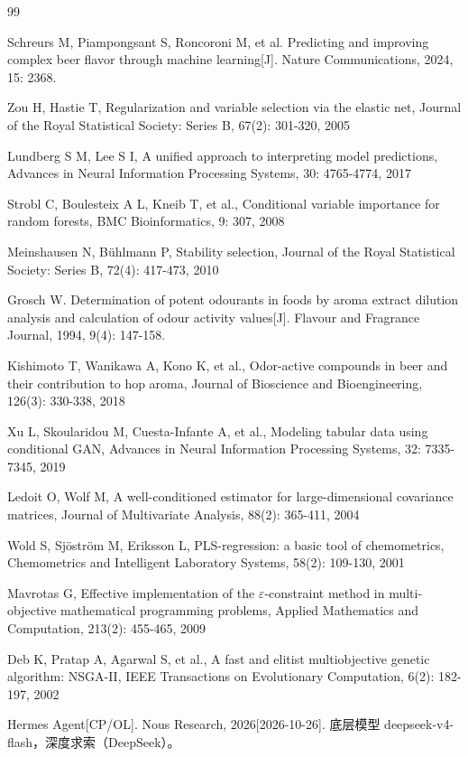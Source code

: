 \renewcommand{\refname}{}
\begin{thebibliography}{99}

 Schreurs M, Piampongsant S, Roncoroni M, et al. Predicting and improving complex beer flavor through machine learning[J]. Nature Communications, 2024, 15: 2368.

 Zou H, Hastie T, Regularization and variable selection via the elastic net, Journal of the Royal Statistical Society: Series B, 67(2): 301-320, 2005

 Lundberg S M, Lee S I, A unified approach to interpreting model predictions, Advances in Neural Information Processing Systems, 30: 4765-4774, 2017

 Strobl C, Boulesteix A L, Kneib T, et al., Conditional variable importance for random forests, BMC Bioinformatics, 9: 307, 2008

 Meinshausen N, Bühlmann P, Stability selection, Journal of the Royal Statistical Society: Series B, 72(4): 417-473, 2010

 Grosch W. Determination of potent odourants in foods by aroma extract dilution analysis and calculation of odour activity values[J]. Flavour and Fragrance Journal, 1994, 9(4): 147-158.

 Kishimoto T, Wanikawa A, Kono K, et al., Odor-active compounds in beer and their contribution to hop aroma, Journal of Bioscience and Bioengineering, 126(3): 330-338, 2018

 Xu L, Skoularidou M, Cuesta-Infante A, et al., Modeling tabular data using conditional GAN, Advances in Neural Information Processing Systems, 32: 7335-7345, 2019

 Ledoit O, Wolf M, A well-conditioned estimator for large-dimensional covariance matrices, Journal of Multivariate Analysis, 88(2): 365-411, 2004

 Wold S, Sjöström M, Eriksson L, PLS-regression: a basic tool of chemometrics, Chemometrics and Intelligent Laboratory Systems, 58(2): 109-130, 2001

 Mavrotas G, Effective implementation of the $\varepsilon$-constraint method in multi-objective mathematical programming problems, Applied Mathematics and Computation, 213(2): 455-465, 2009

 Deb K, Pratap A, Agarwal S, et al., A fast and elitist multiobjective genetic algorithm: NSGA-II, IEEE Transactions on Evolutionary Computation, 6(2): 182-197, 2002

 Hermes Agent[CP/OL]. Nous Research, 2026[2026-10-26]. 底层模型 deepseek-v4-flash，深度求索（DeepSeek）。

\end{thebibliography}
